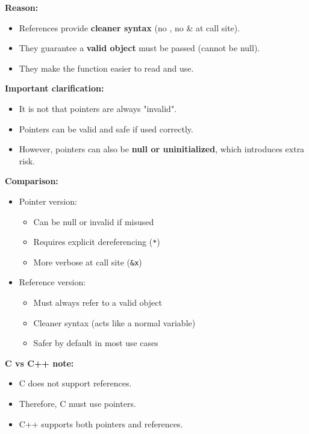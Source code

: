\documentclass[10pt]{article}
\newcommand{\pbreak}{\vspace{30pt}}
\begin{document}
\begin{itemize}
\textbf{Reason:}
\begin{itemize}
    \item References provide \textbf{cleaner syntax} (no \*, no \& at call site).
    \item They guarantee a \textbf{valid object} must be passed (cannot be null).
    \item They make the function easier to read and use.
\end{itemize}

\pbreak

\textbf{Important clarification:}
\begin{itemize}
    \item It is not that pointers are always "invalid".
    \item Pointers can be valid and safe if used correctly.
    \item However, pointers can also be \textbf{null or uninitialized}, which introduces extra risk.
\end{itemize}

\pbreak

\textbf{Comparison:}

\begin{itemize}
    \item Pointer version:
    \begin{itemize}
        \item Can be null or invalid if misused
        \item Requires explicit dereferencing (\verb|*|)
        \item More verbose at call site (\verb|&x|)
    \end{itemize}

    \item Reference version:
    \begin{itemize}
        \item Must always refer to a valid object
        \item Cleaner syntax (acts like a normal variable)
        \item Safer by default in most use cases
    \end{itemize}
\end{itemize}

\pbreak

\textbf{C vs C++ note:}
\begin{itemize}
    \item C does not support references.
    \item Therefore, C must use pointers.
    \item C++ supports both pointers and references.\\
\end{itemize}



\end{itemize}
\end{document}
